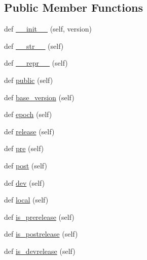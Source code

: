 \subsection*{Public Member Functions}
\begin{DoxyCompactItemize}
\item 
def \hyperlink{classpkg__resources_1_1__vendor_1_1packaging_1_1version_1_1LegacyVersion_ae5d3f571bca144067e99fc12c89f1814}{\+\_\+\+\_\+init\+\_\+\+\_\+} (self, version)
\item 
def \hyperlink{classpkg__resources_1_1__vendor_1_1packaging_1_1version_1_1LegacyVersion_a12e3140dca0d1608e94532a8c4290bc3}{\+\_\+\+\_\+str\+\_\+\+\_\+} (self)
\item 
def \hyperlink{classpkg__resources_1_1__vendor_1_1packaging_1_1version_1_1LegacyVersion_a0882c578a893a399d01ee90b3f218b5c}{\+\_\+\+\_\+repr\+\_\+\+\_\+} (self)
\item 
def \hyperlink{classpkg__resources_1_1__vendor_1_1packaging_1_1version_1_1LegacyVersion_a3bc07656d9072933898f618d685113cf}{public} (self)
\item 
def \hyperlink{classpkg__resources_1_1__vendor_1_1packaging_1_1version_1_1LegacyVersion_ada7b51696361b3339007d717a7eded4d}{base\+\_\+version} (self)
\item 
def \hyperlink{classpkg__resources_1_1__vendor_1_1packaging_1_1version_1_1LegacyVersion_a9b00c13dcb0f5c5d333ed812b40704de}{epoch} (self)
\item 
def \hyperlink{classpkg__resources_1_1__vendor_1_1packaging_1_1version_1_1LegacyVersion_ac08f29eacb1e2b76f44ca95e7fc0b476}{release} (self)
\item 
def \hyperlink{classpkg__resources_1_1__vendor_1_1packaging_1_1version_1_1LegacyVersion_a19a042f6e3e8c2d7edcfa494afd2775d}{pre} (self)
\item 
def \hyperlink{classpkg__resources_1_1__vendor_1_1packaging_1_1version_1_1LegacyVersion_ac657642a7e87f99c2121dc9bf237de53}{post} (self)
\item 
def \hyperlink{classpkg__resources_1_1__vendor_1_1packaging_1_1version_1_1LegacyVersion_af765929a2cf23da1a7b6b7a0c6091dad}{dev} (self)
\item 
def \hyperlink{classpkg__resources_1_1__vendor_1_1packaging_1_1version_1_1LegacyVersion_a9ffd76cde683437bb134266d2480e23d}{local} (self)
\item 
def \hyperlink{classpkg__resources_1_1__vendor_1_1packaging_1_1version_1_1LegacyVersion_af1c08627fa6f1cbfc1d09f2ccb48746a}{is\+\_\+prerelease} (self)
\item 
def \hyperlink{classpkg__resources_1_1__vendor_1_1packaging_1_1version_1_1LegacyVersion_afb598a951757802d499b33a0d09fea29}{is\+\_\+postrelease} (self)
\item 
def \hyperlink{classpkg__resources_1_1__vendor_1_1packaging_1_1version_1_1LegacyVersion_a7275ca62e764b9ba392a85514d269fee}{is\+\_\+devrelease} (self)
\end{DoxyCompactItemize}



